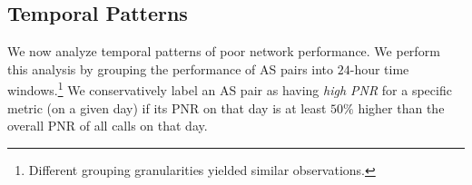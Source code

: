 \subsection{Temporal Patterns}
\label{subsec:measurement:voip:temporal}

We now analyze temporal patterns of poor network 
performance. 
We perform this analysis by grouping the 
performance of AS pairs into $24$-hour time 
windows.\footnote{Different grouping granularities
yielded similar observations.}
We conservatively label an AS pair as having 
{\em high PNR} for a specific metric (on a given day) if 
its PNR on that day is at least $50\%$ higher than the 
overall PNR of all calls on that day. 



